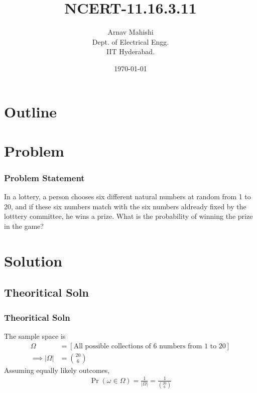 \documentclass{beamer}
\title{NCERT-11.16.3.11}
\author{Arnav Mahishi \\ Dept. of Electrical Engg.\\IIT Hyderabad.}
\date{\today}
\providecommand{\sbrak}[1]{\ensuremath{{}\left[#1\right]}}
\providecommand{\brak}[1]{\ensuremath{\left(#1\right)}}
\theoremstyle{remark}
\providecommand{\abs}[1]{\left\vert#1\right\vert}
\numberwithin{equation}{section}
\begin{document}
\begin{frame}
\titlepage
\end{frame}
\section*{Outline}
\section{Problem}
\begin{frame}
\frametitle{Problem Statement}
In a lottery, a person chooses six different natural numbers at random from 1 to 20, and if these six numbers match with the six numbers aldready fixed by the lotttery committee, he wins a prize. What is the probability of winning the prize in the game?
\end{frame}
\section{Solution}
\subsection{Theoritical Soln}
\begin{frame}
\frametitle{Theoritical Soln}
The sample space is 
\begin{align}
  \Omega &= \sbrak{\text{All possible collections of 6 numbers from 1 to 20}}\\
  \implies\abs{\Omega}&=\binom{20}{6}
\end{align}
Assuming equally likely outcomes, 
\begin{align}
  \Pr\brak{\omega \in \Omega} = \frac{1}{\abs{\Omega}}=\frac{1}{\binom{20}{6}}
\end{align}
\end{frame}
\end{document}

